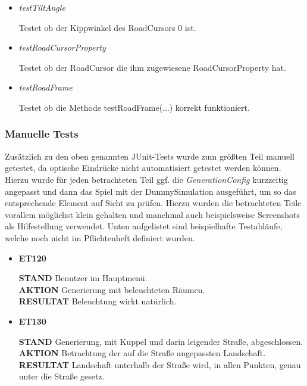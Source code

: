 \begin{itemize}
	\item \textit{testTiltAngle}
        \begin{leftbar}[0.9\linewidth]
			Testet ob der Kippwinkel des RoadCursors 0 ist.
		\end{leftbar}
	\item \textit{testRoadCursorProperty}
        \begin{leftbar}[0.9\linewidth]
			Testet ob der RoadCursor die ihm zugewiesene RoadCursorProperty hat.
		\end{leftbar}
	\item \textit{testRoadFrame}
        \begin{leftbar}[0.9\linewidth]
			Testet ob die Methode testRoadFrame(...) korrekt funktioniert.
		\end{leftbar}
\end{itemize}

\subsubsection{Manuelle Tests}

	Zusätzlich zu den oben genannten JUnit-Tests wurde zum größten Teil manuell getestet, da optische Eindrücke 
	nicht automatisiert getestet werden können. Hierzu wurde für jeden betrachteten Teil ggf. die 
	\textit{GenerationConfig} kurzzeitig angepasst und dann das Spiel mit der DummySimulation ausgeführt, um so das
	entsprechende Element auf Sicht zu prüfen. Hierzu wurden die betrachteten Teile vorallem möglichst klein gehalten
	und manchmal auch beispielsweise Screenshots als Hilfestellung verwendet. Unten aufgelistet sind beispielhafte 
	Testabläufe, welche noch nicht im Pflichtenheft definiert wurden.

	\begin{itemize} [label={}]
		\item \textbf{ET120}\par %
			\textbf{STAND} Benutzer im Hauptmenü.\\
			\textbf{AKTION} Generierung mit beleuchteten Räumen.\\
            \textbf{RESULTAT} Beleuchtung wirkt natürlich.\\\par
            
        \item \textbf{ET130}\par %
			\textbf{STAND} Generierung, mit Kuppel und darin leigender Straße, abgeschlossen.\\
			\textbf{AKTION} Betrachtung der auf die Straße angepassten Landschaft.\\
			\textbf{RESULTAT} Landschaft unterhalb der Straße wird, in allen Punkten, 
			genau unter die Straße gesetz.\\\par

	\end{itemize}